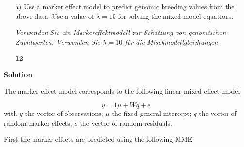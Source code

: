 \documentclass[
]{article}
\newenvironment{Shaded}{\begin{snugshade}}{\end{snugshade}}
\newcommand{\AttributeTok}[1]{\textcolor[rgb]{0.77,0.63,0.00}{#1}}
\newcommand{\DecValTok}[1]{\textcolor[rgb]{0.00,0.00,0.81}{#1}}
\newcommand{\FunctionTok}[1]{\textcolor[rgb]{0.00,0.00,0.00}{#1}}
\newcommand{\NormalTok}[1]{#1}
\newcommand{\OtherTok}[1]{\textcolor[rgb]{0.56,0.35,0.01}{#1}}
\newcommand{\SpecialCharTok}[1]{\textcolor[rgb]{0.00,0.00,0.00}{#1}}
\newcommand{\StringTok}[1]{\textcolor[rgb]{0.31,0.60,0.02}{#1}}
\newcommand{\points}[1]
{\begin{flushright}\textbf{#1}\end{flushright}}
\newcommand{\solstart}
{\vspace{3ex}\textbf{Solution}:}
\begin{document}
\clearpage
\pagebreak

\begin{enumerate}
\item[a)] Use a marker effect model to predict genomic breeding values from the above data. Use a value of $\lambda = 10$ for solving the mixed model equations.

\textit{Verwenden Sie ein Markereffektmodell zur Schätzung von genomischen Zuchtwerten. Verwenden Sie $\lambda = 10$ für die Mischmodellgleichungen}
\points{12}
\end{enumerate}

\solstart

The marker effect model corresponds to the following linear mixed effect
model

\[y = 1\mu + Wq + e\] with \(y\) the vector of observations; \(\mu\) the
fixed general intercept; \(q\) the vector of random marker effects;
\(e\) the vector of random residuals.

First the marker effects are predicted using the following MME

\begin{Shaded}
\end{Shaded}
\end{document}
